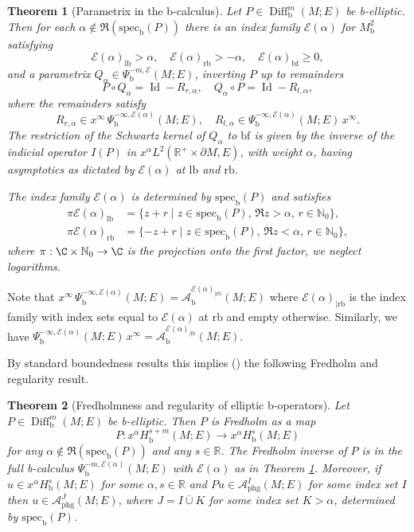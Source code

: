 \documentclass[JEP,XML,SOM,Unicode,NoFloatCountersInSection,published]{cedram}
\theoremstyle{plain}
\newtheorem{Th}{Theorem}[section]
\theoremstyle{definition}
\newcommand {\N}{\mathbb{N}}
\newcommand{\R}{{\mathbb{R}}}
\newcommand\calA{{\mathcal A}}
\newcommand\calE{{\mathcal E}}
\newcommand {\phg}{{\mathrm{phg}}}
\newcommand{\lf}{{\mathrm{lb}}}
\newcommand{\rf}{{\mathrm{rb}}}
\newcommand{\bb}{{\mathrm{b}}}
\newcommand{\bbf}{{\mathrm{bf}}}
\newcommand{\specb}{\mathrm{spec}_\bb}
\DeclareMathOperator{\Diff}{Diff}
\DeclareMathOperator{\Id}{Id}
\newcommand{\dM}{{\partial M}}
\newcommand{\ocup}{\mathbin{\overline{\cup}}}
\begin{document}
\begin{Th}[Parametrix in the b-calculus] \label{thm: b-parametrix}
Let $P \in \Diff^m_\bb(M; E)$ be b-elliptic. Then for each $\alpha \notin \Re (\specb(P))$
there is an index family $\calE(\alpha)$ for $M^2_\bb$ satisfying
\[
\calE(\alpha)_{\lf} > \alpha,\quad \calE(\alpha)_{\rf} > -\alpha,\quad \calE(\alpha)_{\bbf} \geq 0,
\]
and a parametrix
$Q_{\alpha} \in \Psi_\bb^{-m, \calE}(M; E)$,
inverting $P$ up to remainders
\[
P \circ Q_{\alpha} = \Id - R_{r,\alpha},\quad Q_{\alpha} \circ P= \Id - R_{l,\alpha},
\]
where the remainders satisfy
\[
R_{r,\alpha} \in x^\infty\,\Psi_\bb^{-\infty,\calE(\alpha)} (M;E)
,\quad
R_{l,\alpha} \in \Psi_\bb^{-\infty,\calE(\alpha)}(M;E)\,x^\infty.
\]
The restriction of the Schwartz kernel of $Q_{\alpha}$ to $\bbf$ is given by the inverse of the
indicial operator $I(P)$ in $x^\alpha L^2(\R^+ \times \dM, E)$, with weight $\alpha$, \ie having asymptotics as dictated by $\calE(\alpha)$ at $\lf$ and $\rf$.

The index family $\calE(\alpha)$ is determined by $\specb(P)$
and satisfies
\begin{equation}
\label{eqn:index sets}
\begin{split}
\pi\calE(\alpha)_\lf &= \{z+r \mid z\in \specb(P),\,\Re z >\alpha,\,r\in\N_0\},\\
\pi\calE(\alpha)_\rf &= \{-z+r \mid z\in \specb(P),\,\Re z <\alpha,\,r\in\N_0\},
\end{split}
\end{equation}
where $\pi:\C\times\N_0\to\C$ is the projection onto the first factor, \ie we neglect logarithms.
\end{Th}

Note that $x^\infty\,\Psi_\bb^{-\infty,\calE(\alpha)}(M;E) = \calA_\bb^{\calE(\alpha)_{|\rf}}(M;E)$ where $\calE(\alpha)_{|\rf}$ is the index family with index sets equal to $\calE(\alpha)$ at $\rf$ and empty otherwise. Similarly, we have $\Psi_\bb^{-\infty,\calE(\alpha)} (M;E)\,x^\infty = \calA_\bb^{\calE(\alpha)_{|\lf}}(M;E)$.

By standard boundedness results this implies (\cf \cite[Th.\,5.60 and Prop. 5.61]{melrose1993atiyah})
the following Fredholm and regularity result.

\skpt
\begin{Th}[Fredholmness and regularity of elliptic b-operators]
\label{thm:b Fredholm regularity}
Let $P\in \Diff^m_\bb(M; E)$ be b-elliptic. Then $P$ is Fredholm as a map
\[
P:x^\alpha H^{s+m}_\bb(M; E) \to x^{\alpha}H^{s}_\bb(M; E)
\]
for any $\alpha \notin \Re (\specb (P))$ and any $s\in\R$. The Fredholm inverse of $P$ is in
the full b\nobreakdash-calculus $\Psi_\bb^{-m, \calE(\alpha)}(M; E)$ with $\calE(\alpha)$ as in Theorem
\ref{thm: b-parametrix}. Moreover, if $u \in x^\alpha H^s_\bb(M; E)$ for some $\alpha,s\in\R$ and
$Pu \in \mathcal{A}^I_{\phg}(M; E)$ for some index set $I$ then $u\in \mathcal{A}^J_{\phg}(M; E)$,
where $J = I \ocup K$ for some index set $K>\alpha$, determined by $\specb(P)$.
\end{Th}
\end{document}

